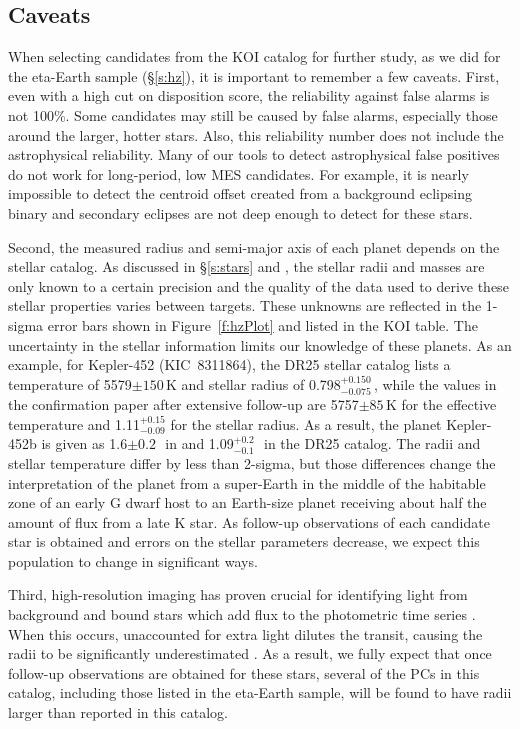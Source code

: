 \subsection{Caveats}
When selecting candidates from the KOI catalog for further study, as we did for the eta-Earth sample (\S\ref{s:hz}), it is important to remember a few caveats. First, even with a high cut on disposition score, the reliability against false alarms is not 100\%. Some candidates may still be caused by false alarms, especially those around the larger, hotter stars. Also, this reliability number does not include the astrophysical reliability. Many of our tools to detect astrophysical false positives do not work for long-period, low MES candidates. For example, it is nearly impossible to detect the centroid offset created from a background eclipsing binary and secondary eclipses are not deep enough to detect for these stars. 

Second, the measured radius and semi-major axis of each planet depends on the stellar catalog.   As discussed in \S\ref{s:stars} and \citet{Mathur2017ApJS}, the stellar radii and masses are only known to a certain precision and the quality of the data used to derive these stellar properties varies between targets. These unknowns are reflected in the 1-sigma error bars shown in Figure~\ref{f:hzPlot} and listed in the KOI table. The uncertainty in the stellar information limits our knowledge of these planets.  As an example, for Kepler-452 (KIC~8311864), the DR25 stellar catalog lists a temperature of 5579$\pm150$\,K and stellar radius of 0.798$^{+0.150}_{-0.075}$\,\rsun, while the values in the confirmation paper \citep{Jenkins2015} after extensive follow-up are 5757$\pm85$\,K for the effective temperature and 1.11$^{+0.15}_{-0.09}$ for the stellar radius.  As a result, the planet Kepler-452b is given as 1.6$\pm0.2$\,\re\ in \citet{Jenkins2015} and 1.09$^{+0.2}_{-0.1}$\,\re\ in the DR25 catalog. The radii and stellar temperature differ by less than 2-sigma, but those differences change the interpretation of the planet from a super-Earth in the middle of the habitable zone of an early G dwarf host to an Earth-size planet receiving about half the amount of flux from a late K star.  As follow-up observations of each candidate star is obtained and errors on the stellar parameters decrease, we expect this population to change in significant ways.  

Third, high-resolution imaging has proven crucial for identifying light from background and bound stars which add flux to the \Kepler{} photometric time series \citep{Furlan2017}. When this occurs, unaccounted for extra light dilutes the transit, causing the radii to be significantly underestimated \citep{Ciardi2015, Furlan2017densities}.  As a result, we fully expect that once follow-up observations are obtained for these stars, several of the PCs in this catalog, including those listed in the eta-Earth sample, will be found to have radii larger than reported in this catalog. 




